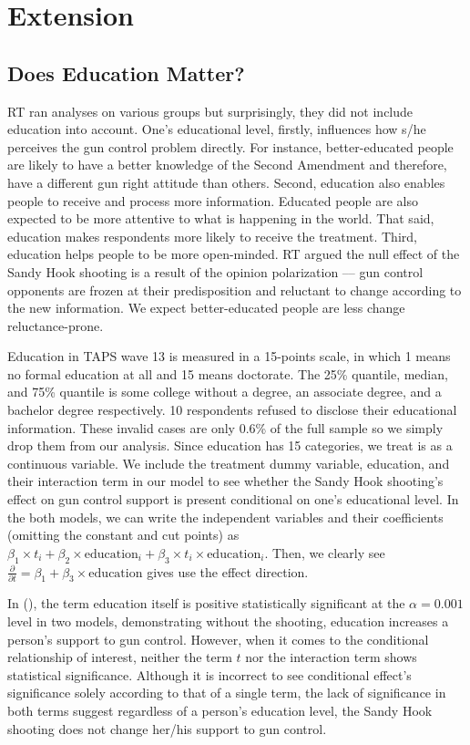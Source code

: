 \documentclass[11pt]{article}
\begin{document}
\section*{Extension}
\subsection*{Does Education Matter?}
RT ran analyses on various groups but surprisingly, they did not include education into account. One’s educational level, firstly, influences how s/he perceives the gun control problem directly. For instance, better-educated people are likely to have a better knowledge of the Second Amendment and therefore, have a different gun right attitude than others. Second, education also enables people to receive and process more information. Educated people are also expected to be more attentive to what is happening in the world. That said, education makes respondents more likely to receive the treatment. Third, education helps people to be more open-minded. RT argued the null effect of the Sandy Hook shooting is a result of the opinion polarization –– gun control opponents are frozen at their predisposition and reluctant to change according to the new information. We expect better-educated people are less change reluctance-prone. 

Education in TAPS wave 13 is measured in a 15-points scale, in which 1 means no formal education at all and 15 means doctorate. The 25\% quantile, median, and 75\% quantile is some college without a degree, an associate degree, and a bachelor degree respectively. 10 respondents refused to disclose their educational information. These invalid cases are only 0.6\% of the full sample so we simply drop them from our analysis. Since education has 15 categories, we treat is as a continuous variable. We include the treatment dummy variable, education, and their interaction term in our model to see whether the Sandy Hook shooting’s effect on gun control support is present conditional on one’s educational level. In the both models, we can write the independent variables and their coefficients (omitting the constant and cut points) as \(\beta_1\times t_i + \beta_2\times \text{education}_i + \beta_3\times t_i\times\text{education}_i\). Then, we clearly see \(\frac{\partial}{\partial t} = \beta_1 + \beta_3\times \text{education}\) gives use the effect direction.

In (), the term education itself is positive statistically significant at the \(\alpha = 0.001\) level in two models, demonstrating without the shooting, education increases a person’s support to gun control. However, when it comes to the conditional relationship of interest, neither the term \(t\) nor the interaction term shows statistical significance. Although it is incorrect to see conditional effect’s significance solely according to that of a single term, the lack of significance in both terms suggest regardless of a person’s education level, the Sandy Hook shooting does not change her/his support to gun control. 
\end{document}
